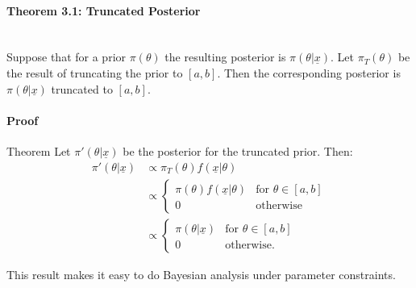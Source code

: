 \paragraph{Theorem 3.1: Truncated Posterior}{~\\ 
Suppose that for a prior $\pi(\theta)$ the resulting posterior is $\pi(\theta | \underline{x})$.
Let $\pi_T(\theta)$ be the result of truncating the prior to $[a,b]$.
Then the corresponding posterior is $\pi(\theta | \underline{x})$ truncated to $[a,b]$.
\paragraph{Proof}{Theorem}{}
Let $\pi'(\theta | \underline{x})$ be the posterior for the truncated prior. Then:
\begin{align*}
\pi'(\theta | \underline{x}) &\propto \pi_T(\theta) f(\underline{x}|\theta) \\
& \propto
\begin{cases}
  \pi(\theta) f(\underline{x}|\theta) & \text{for } \theta \in [a,b] \\
  0 & \text{otherwise}
\end{cases} \\
& \propto
\begin{cases}
  \pi(\theta | \underline{x}) & \text{for } \theta \in [a,b] \\
  0 & \text{otherwise}.
\end{cases}
\end{align*}

This result makes it easy to do Bayesian analysis under parameter constraints.}


















\clearpage
